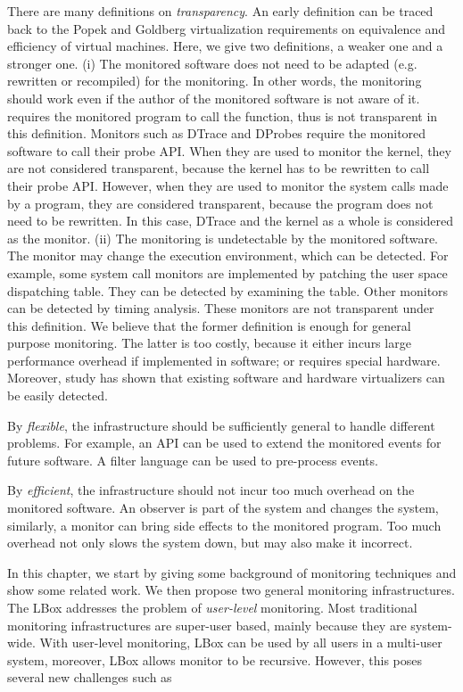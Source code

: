 There are many definitions on {\em transparency}.
An early definition can be traced back to the Popek and Goldberg
virtualization requirements \cite{popek1974formal} on
equivalence and efficiency of virtual machines.
Here, we give two definitions, a weaker one and a stronger one.
(i) The monitored software does not need to be adapted (e.g. rewritten or
recompiled) for the monitoring.
In other words, the monitoring should work even if the author of the
monitored software is not aware of it.
 requires the monitored program to call the
 function, thus  is not transparent
in this definition.
Monitors such as DTrace and DProbes require the monitored
software to call their probe API.
When they are used to monitor the kernel, they are not considered transparent,
because the kernel has to be rewritten to call their probe API.
However, when they are used to monitor the system calls made by a program,
they are considered transparent, because the program does not need to be
rewritten.
In this case, DTrace and the kernel as a whole is considered as the monitor.
(ii) The monitoring is undetectable by the monitored software.
The monitor may change the execution environment, which can be detected.
For example, some system call monitors are implemented by patching the
user space dispatching table.
They can be detected by examining the table.
Other monitors can be detected by timing analysis.
These monitors are not transparent under this definition.
We believe that the former definition is enough for general purpose monitoring.
The latter is too costly,
because it either incurs large performance overhead if implemented in software;
or requires special hardware.
Moreover, study \cite{raffetseder2007detecting} has shown that existing software
and hardware virtualizers can be easily detected.

By {\em flexible}, the infrastructure should be sufficiently general to
handle different problems.
For example, an API can be used to extend the monitored events for future software.
A filter language can be used to pre-process events.

By {\em efficient}, the infrastructure should not incur too much
overhead on the monitored software.
An observer is part of the system and changes the system, similarly,
a monitor can bring side effects to the monitored program.
Too much overhead not only slows the system down, but may also make
it incorrect.

In this chapter, we start by giving some background of monitoring techniques
and show some related work.
We then propose two general monitoring infrastructures.
The LBox addresses the problem of {\em user-level} monitoring.
Most traditional monitoring infrastructures are super-user based,
mainly because they are system-wide.
With user-level monitoring, LBox can be used by all users in a multi-user
system, moreover, LBox allows monitor to be recursive.
However, this poses several new challenges such as

